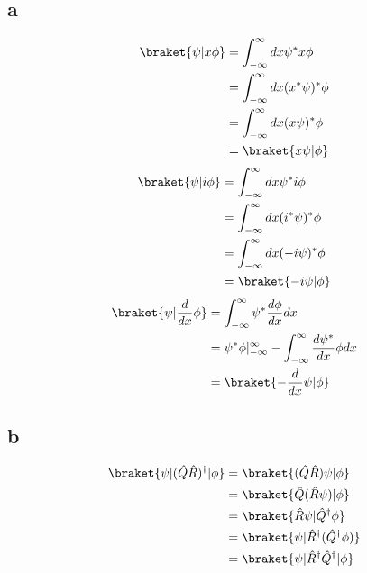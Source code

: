 \subsection*{a}
\begin{equation}
\begin{split}
    \braket{\psi | x\phi} &= \int_{-\infty}^\infty dx\psi^\ast x\phi\\
    &=\int_{-\infty}^\infty dx (x^\ast\psi)^\ast \phi\\
    &=\int_{-\infty}^\infty dx (x\psi)^\ast \phi\\
    &=\braket{x\psi|\phi}
\end{split}
\end{equation}
\begin{equation}
    \begin{split}
    \braket{\psi | i\phi} &= \int_{-\infty}^\infty dx\psi^\ast i\phi\\
    &=\int_{-\infty}^\infty dx (i^\ast\psi)^\ast \phi\\
    &=\int_{-\infty}^\infty dx (-i\psi)^\ast \phi\\
    &=\braket{-i\psi|\phi}
    \end{split}
\end{equation}
\begin{equation}
    \begin{split}
        \braket{\psi|\frac{d}{dx}\phi} &= \int_{-\infty}^\infty\psi^\ast\frac{d\phi}{dx}dx\\
        &=\psi^\ast\phi|_{-\infty}^\infty-\int_{-\infty}^\infty\frac{d\psi^\ast}{dx}\phi dx\\
        &=\braket{-\frac{d}{dx}\psi|\phi}
    \end{split}
\end{equation}

\subsection*{b}
\begin{equation}
    \begin{split}
        \braket{\psi|(\hat{Q}\hat{R})^\dagger|\phi} &= \braket{(\hat{Q}\hat{R})\psi|\phi}\\
        &=\braket{\hat{Q}(\hat{R}\psi)|\phi}\\
        &=\braket{\hat{R}\psi|\hat{Q}^\dagger\phi}\\
        &=\braket{\psi|\hat{R}^\dagger(\hat{Q}^\dagger\phi)}\\
        &=\braket{\psi|\hat{R}^\dagger\hat{Q}^\dagger|\phi}
    \end{split}
\end{equation}

